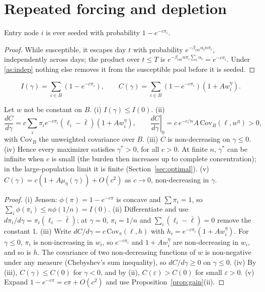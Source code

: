 \section{Repeated forcing and depletion}\label{sec:depletion}

\begin{lemma}
Entry node $i$ is ever seeded with probability $1-e^{-c\pi_i}$.
\end{lemma}
\begin{proof}
While susceptible, it escapes day $t$ with probability $e^{-\beta_{\mathrm{ext}}\alpha_tn\pi_i}$,
independently across days; the product over $t\le T$ is
$e^{-\beta_{\mathrm{ext}}n\pi_i\sum_t\alpha_t}=e^{-c\pi_i}$. Under \ref{as:indep} nothing else
removes it from the susceptible pool before it is seeded.
\end{proof}

\begin{proposition}
\[
I(\gamma)=\sum_{i\in B}\left(1-e^{-c\pi_i}\right),\qquad
C(\gamma)=\sum_{i\in B}\left(1-e^{-c\pi_i}\right)\left(1+Aw_i^\eta\right).
\]
\end{proposition}

\begin{proposition}\label{prop:pos}
Let $w$ not be constant on $B$. (i) $I(\gamma)\le I(0)$. (ii)
\[
\frac{dC}{d\gamma}=c\sum_i\pi_ie^{-c\pi_i}(\ell_i-\bar\ell)(1+Aw_i^\eta),\qquad
\left.\frac{dC}{d\gamma}\right|_0=c\,e^{-c/n}A\,\mathrm{Cov}_B(\ell,w^\eta)>0,
\]
with $\mathrm{Cov}_B$ the unweighted covariance over $B$. (iii) $C$ is non-decreasing on
$\gamma\le0$. (iv) Hence every maximizer satisfies $\gamma^*>0$, for all $c>0$. At finite $n$, $\gamma^*$
can be infinite when $c$ is small (the burden then increases up to complete
concentration); in the large-population limit it is finite
(Section~\ref{sec:optimal}). (v) $C(\gamma)=c(1+A\mu_\eta(\gamma))+O(c^2)$ as $c\to0$, non-decreasing in $\gamma$.
\end{proposition}
\begin{proof}
(i) Jensen: $\phi(\pi)=1-e^{-c\pi}$ is concave and $\sum\pi_i=1$, so
$\sum_i\phi(\pi_i)\le n\phi(1/n)=I(0)$. (ii) Differentiate and use
$d\pi_i/d\gamma=\pi_i(\ell_i-\bar\ell)$; at $\gamma=0$, $\pi_i=1/n$ and $\sum_i(\ell_i-\bar\ell)=0$
remove the constant 1. (iii) Write $dC/d\gamma=c\,\mathrm{Cov}_\pi(\ell,h)$ with
$h_i=e^{-c\pi_i}(1+Aw_i^\eta)$. For $\gamma\le0$, $\pi_i$ is non-increasing in $w_i$, so $e^{-c\pi_i}$ and
$1+Aw_i^\eta$ are non-decreasing in $w_i$, and so is $h$. The covariance of two
non-decreasing functions of $w$ is non-negative under any measure (Chebyshev's
sum inequality), so $dC/d\gamma\ge0$ on $\gamma\le0$. (iv) By (iii), $C(\gamma)\le C(0)$ for $\gamma<0$, and by
(ii), $C(\varepsilon)>C(0)$ for small $\varepsilon>0$. (v) Expand $1-e^{-c\pi}=c\pi+O(c^2)$ and use
Proposition~\ref{prop:gain}(ii).
\end{proof}

